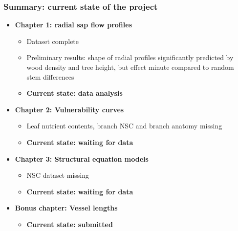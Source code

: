 \documentclass[usepdftitle=false]{beamer}
\newcommand{\Blue}[1]{{\color{blue!50!black}\textbf{#1}}}
\begin{document}
\begin{frame}
	\frametitle{Summary: current state of the project}	
	\begin{itemize}
		\item<1-> \Blue{Chapter 1: radial sap flow profiles}
		\begin{itemize}
			\item Dataset complete
			\item Preliminary results: shape of radial profiles significantly predicted by wood density and tree height, but effect minute compared to random stem differences 
			\item \textbf{Current state: \alert<1>{data analysis}}
		\end{itemize}
		\item<2-> \Blue{Chapter 2: Vulnerability curves}
		\begin{itemize}
			\item Leaf nutrient contents, branch NSC and branch anatomy missing
			\item \textbf{Current state: \alert<2>{waiting for data}}
		\end{itemize}
		\item<3-> \Blue{Chapter 3: Structural equation models}
		\begin{itemize}
			\item NSC dataset missing
			\item \textbf{Current state: \alert<3>{waiting for data}}
		\end{itemize}
		\item<4-> \Blue{Bonus chapter: Vessel lengths}
		\begin{itemize}
			\item \textbf{Current state: \alert<4>{submitted}}
		\end{itemize}
	\end{itemize}
\end{frame}


{
	\begin{frame}[plain]
	\end{frame}
}
\end{document}
